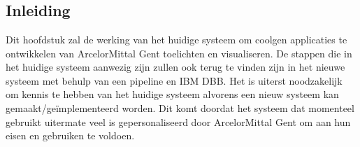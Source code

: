 
\chapter{}%
\label{ch:current system)}

\section{Inleiding}
\label{sec:inleiding_currsys}
Dit hoofdstuk zal de werking van het huidige systeem om coolgen applicaties te ontwikkelen van ArcelorMittal Gent toelichten en visualiseren. De stappen die in het huidige systeem aanwezig zijn zullen ook terug te vinden zijn in het nieuwe systeem met behulp van een pipeline en IBM DBB. Het is uiterst noodzakelijk om kennis te hebben van het huidige systeem alvorens een nieuw systeem kan gemaakt/geïmplementeerd worden. Dit komt doordat het systeem dat momenteel gebruikt uitermate veel is gepersonaliseerd door ArcelorMittal Gent om aan hun eisen en gebruiken te voldoen. 

